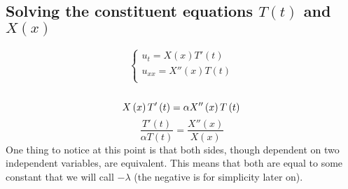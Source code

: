 \documentclass[a4paper]{article}
\begin{document}
        \subsection{Solving the constituent equations $T\left(t\right)$ and $X\left(x\right)$}
            \[
                \begin{cases}
                    u_{t} = X\left(x\right)T'\left(t\right) \\
                    u_{xx} = X''\left(x\right)T\left(t\right) \\
                \end{cases}
            \]
            \\
            \[
                X\left(x\right)T'\left(t\right) = \alpha X''\left(x\right)T\left(t\right) \\
            \]
            \[
                \frac{T'\left(t\right)}{\alpha T\left(t\right)} = \frac{X''\left(x\right)}{X\left(x\right)}
            \]
            One thing to notice at this point is that both sides, though dependent on two independent
            variables, are equivalent. This means that both are equal to some constant that we will
            call $-\lambda$ (the negative is for simplicity later on).
\end{document}
